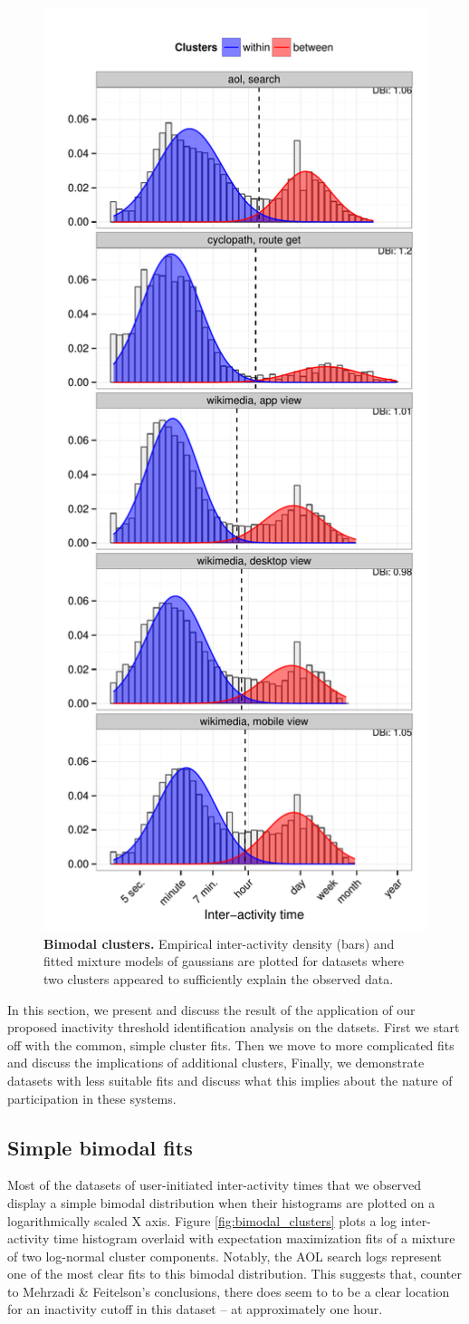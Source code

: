 \begin{figure}
\centering
\includegraphics[width=.45\textwidth]{figures/bimodal_clusters.pdf}
\caption{
    \textbf{Bimodal clusters.} Empirical inter-activity density (bars) and fitted mixture models of gaussians are plotted for datasets where two clusters appeared to sufficiently explain the observed data.
}
\end{figure}

In this section, we present and discuss the result of the application of our proposed inactivity threshold identification analysis on the datsets.  First we start off with the common, simple cluster fits.  Then we move to more complicated fits and discuss the implications of additional clusters,  Finally, we demonstrate datasets with less suitable fits and discuss what this implies about the nature of participation in these systems.

\subsection{Simple bimodal fits}
Most of the datasets of user-initiated inter-activity times that we observed display a simple bimodal distribution when their histograms are plotted on a logarithmically scaled X axis.  Figure \ref{fig:bimodal_clusters} plots a log inter-activity time histogram overlaid with expectation maximization fits of a mixture of two log-normal cluster components.  Notably, the AOL search logs represent one of the most clear fits to this bimodal distribution.  This suggests that, counter to Mehrzadi
\& Feitelson's conclusions\cite{mehrzadi2012onextracting}, there does seem to to be a clear location for an inactivity cutoff in this dataset -- at approximately one hour.

